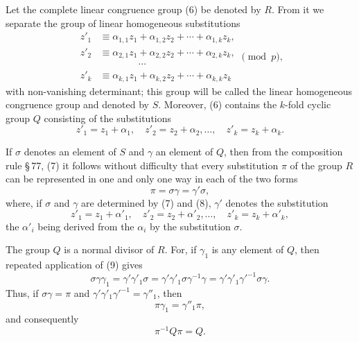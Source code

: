 \documentclass[11pt]{article}
\begin{document}
Let the complete linear congruence group (6) be denoted by $R$. From it we separate the group of linear homogeneous substitutions
\begin{equation}
\begin{aligned}
 z'_1&\equiv \alpha_{1,1}z_1+\alpha_{1,2}z_2+\cdots+\alpha_{1,k}z_k,\\
 z'_2&\equiv \alpha_{2,1}z_1+\alpha_{2,2}z_2+\cdots+\alpha_{2,k}z_k,\\
 &\hspace{4em}\cdots\\
 z'_k&\equiv \alpha_{k,1}z_1+\alpha_{k,2}z_2+\cdots+\alpha_{k,k}z_k
\end{aligned}
\pmod p,
 \tag{7}
\end{equation}
with non-vanishing determinant; this group will be called the linear homogeneous congruence group and denoted by $S$. Moreover, (6) contains the $k$-fold cyclic group $Q$ consisting of the substitutions
\begin{equation}
 z'_1=z_1+\alpha_1,\quad
 z'_2=z_2+\alpha_2,\ldots,\quad
 z'_k=z_k+\alpha_k .
 \tag{8}
\end{equation}

If $\sigma$ denotes an element of $S$ and $\gamma$ an element of $Q$, then from the composition rule \S\,77, (7) it follows without difficulty that every substitution $\pi$ of the group $R$ can be represented in one and only one way in each of the two forms
\begin{equation}
 \pi=\sigma\gamma=\gamma'\sigma,
 \tag{9}
\end{equation}
where, if $\sigma$ and $\gamma$ are determined by (7) and (8), $\gamma'$ denotes the substitution
\begin{equation}
 z'_1=z_1+\alpha'_1,\quad
 z'_2=z_2+\alpha'_2,\ldots,\quad
 z'_k=z_k+\alpha'_k,
 \tag{10}
\end{equation}
the $\alpha'_i$ being derived from the $\alpha_i$ by the substitution $\sigma$.

The group $Q$ is a normal divisor of $R$. For, if $\gamma_1$ is any element of $Q$, then repeated application of (9) gives
\[
 \sigma\gamma\gamma_1
 =\gamma'\gamma'_1\sigma
 =\gamma'\gamma'_1\sigma\gamma^{-1}\gamma
 =\gamma'\gamma'_1\gamma'^{-1}\sigma\gamma.
\]
Thus, if $\sigma\gamma=\pi$ and $\gamma'\gamma'_1\gamma'^{-1}=\gamma''_1$, then
\[
 \pi\gamma_1=\gamma''_1\pi,
\]
and consequently
\begin{equation}
 \pi^{-1}Q\pi=Q .
 \tag{11}
\end{equation}
\end{document}
